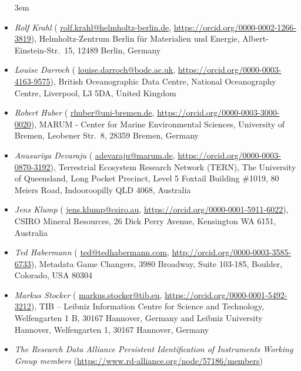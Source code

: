 \documentclass[titlepage=true,twoside=false,DIV=13]{scrartcl}
\begin{document}
\begin{itemize}\emergencystretch 3em
\item \emph{Rolf Krahl}
  ({\small
  \href{mailto:rolf.krahl@helmholtz-berlin.de}{rolf.krahl@helmholtz-berlin.de},
  \url{https://orcid.org/0000-0002-1266-3819}}),
  Helmholtz-Zentrum Berlin für Materialien und Energie,
  Albert-Einstein-Str.\ 15, 12489 Berlin, Germany
\item \emph{Louise Darroch}
  ({\small
  \href{mailto:louise.darroch@bodc.ac.uk}{louise.darroch@bodc.ac.uk},
  \url{https://orcid.org/0000-0003-4163-9575}}),
  British Oceanographic Data Centre, National Oceanography Centre,
  Liverpool, L3 5DA, United Kingdom
\item \emph{Robert Huber}
  ({\small
  \href{mailto:rhuber@uni-bremen.de}{rhuber@uni-bremen.de},
  \url{https://orcid.org/0000-0003-3000-0020}}),
  MARUM - Center for Marine Environmental Sciences, University of Bremen,
  Leobener Str.\ 8, 28359 Bremen, Germany
\item \emph{Anusuriya Devaraju}
  ({\small
  \href{mailto:adevaraju@marum.de}{adevaraju@marum.de},
  \url{https://orcid.org/0000-0003-0870-3192}}),
  Terrestrial Ecosystem Research Network (TERN), The University of
  Queensland, Long Pocket Precinct, Level 5 Foxtail Building \#1019,
  80 Meiers Road, Indooroopilly QLD 4068, Australia
\item \emph{Jens Klump}
  ({\small
  \href{mailto:jens.klump@csiro.au}{jens.klump@csiro.au},
  \url{https://orcid.org/0000-0001-5911-6022}}),
  CSIRO Mineral Resources, 26 Dick Perry Avenue, Kensington WA 6151,
  Australia
\item \emph{Ted Habermann}
  ({\small
  \href{mailto:ted@tedhabermann.com}{ted@tedhabermann.com},
  \url{http://orcid.org/0000-0003-3585-6733}}),
  Metadata Game Changers,
  3980 Broadway, Suite 103-185, Boulder, Colorado, USA 80304
\item \emph{Markus Stocker}
  ({\small
  \href{mailto:markus.stocker@tib.eu}{markus.stocker@tib.eu},
  \url{https://orcid.org/0000-0001-5492-3212}}),
  TIB -- Leibniz Information Centre for Science and Technology,
  Welfengarten 1 B, 30167 Hannover, Germany and
  Leibniz University Hannover, Welfengarten 1, 30167 Hannover, Germany
\item \emph{The Research Data Alliance Persistent Identification of Instruments
  Working Group members}
  ({\small \url{https://www.rd-alliance.org/node/57186/members}})
\end{itemize}

\tableofcontents
\cleardoublepage
{}
\end{document}
